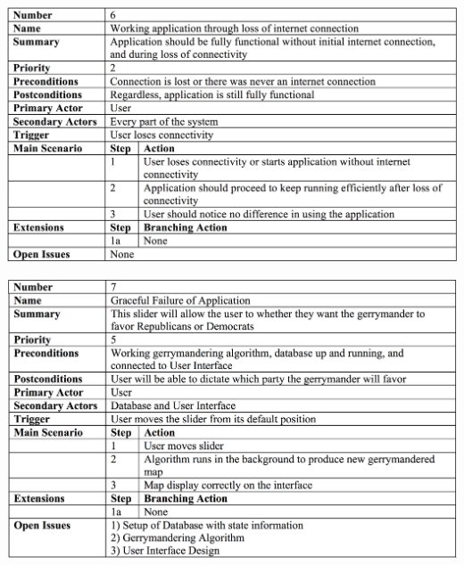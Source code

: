 \documentclass{article}
\begin{document}
\begin{addmargin}[4em]{0em}
\begin{center}
\hspace*{-2cm}      
\includegraphics[scale=.25]{LossOfNetwork.png}
\end{center}

\begin{center}
\hspace*{-2cm}      
\includegraphics[scale=.25]{Failures.png}
\end{center}



\end{addmargin}
\end{document}
